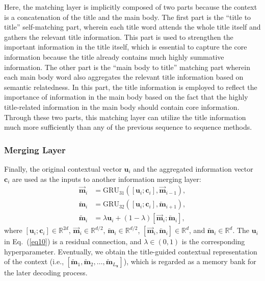 \documentclass[letterpaper]{article} %
\begin{document}
Here, the matching layer is implicitly composed of two parts because the context is a concatenation of the title and the main body. The first part is the ``title to title'' self-matching part, wherein each title word attends the whole title itself and gathers the relevant title information. This part is used to strengthen the important information in the title itself, which is essential to capture the core information because the title already contains much highly summative information. The other part is the ``main body to title'' matching part wherein each main body word also aggregates the relevant title information based on semantic relatedness. In this part, the title information is employed to reflect the importance of information in the main body based on the fact that the highly title-related information in the main body should contain core information.
Through these two parts, this matching layer can utilize the title information much more sufficiently than any of the previous sequence to sequence methods.

\subsubsection{Merging Layer}
Finally, the original contextual vector $\mathbf{u}_i$ and the aggregated information vector $\mathbf{c}_i$
are used as the inputs to another information merging layer:
\begin{align}
\overrightarrow{\mathbf{m}}_i &= \text{GRU}_{31}([\mathbf{u}_i; \mathbf{c}_i], \overrightarrow{\mathbf{m}}_{i-1}),\\
\overleftarrow{\mathbf{m}}_i &= \text{GRU}_{32}([\mathbf{u}_i; \mathbf{c}_i], \overleftarrow{\mathbf{m}}_{i+1}),\\
\widetilde{\mathbf{m}}_i &= \lambda \mathbf{u}_i + (1-\lambda) [\overrightarrow{\mathbf{m}}_i; \overleftarrow{\mathbf{m}}_i], \label{eq10}
\end{align}
where $[\mathbf{u}_i; \mathbf{c}_i] \in \mathbb{R}^{2d}$, $\overrightarrow{\mathbf{m}}_i \in \mathbb{R}^{d/2}$,
$\overleftarrow{\mathbf{m}}_i \in \mathbb{R}^{d/2}$,
$[\overrightarrow{\mathbf{m}}_i, \overleftarrow{\mathbf{m}}_i] \in \mathbb{R}^d$,
and $\widetilde{\mathbf{m}}_i \in \mathbb{R}^d$. The $\mathbf{u}_i$ in Eq.~(\ref{eq10}) is a residual connection, and $\lambda \in (0,1)$ is the corresponding hyperparameter. Eventually, we obtain the title-guided contextual representation of the context (i.e., $[\widetilde{\mathbf{m}}_1, \widetilde{\mathbf{m}}_2,\dots, \widetilde{\mathbf{m}}_{L_{\mathbf{x}}}]$), which is regarded as a memory bank for the later decoding process.
\end{document}
